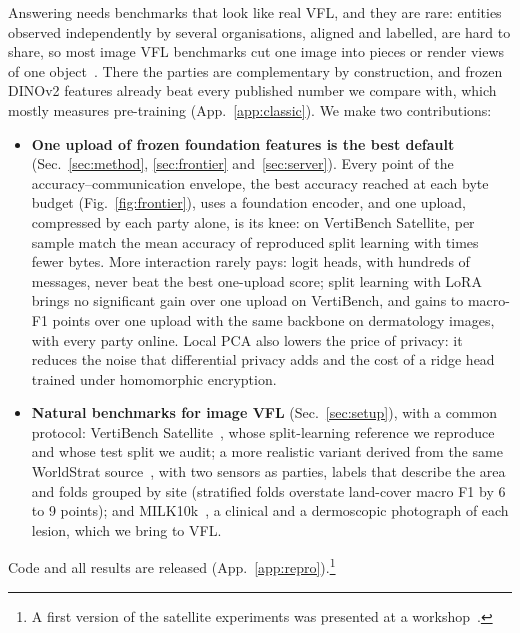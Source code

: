 Answering needs benchmarks that look like real VFL, and they are rare: entities observed independently by several organisations, aligned and labelled, are hard to share, so most image VFL benchmarks cut one image into pieces or render views of one object~\cite{zou2024vflair,wu2024vertibench}. There the parties are complementary by construction, and frozen DINOv2 features already beat every published number we compare with, which mostly measures pre-training (App.~\ref{app:classic}). We make two contributions:
\begin{itemize}
\item[\textbf{C1}] \textbf{One upload of frozen foundation features is the best default} (Sec.~\ref{sec:method}, \ref{sec:frontier} and~\ref{sec:server}). Every point of the accuracy--communication envelope, the best accuracy reached at each byte budget (Fig.~\ref{fig:frontier}), uses a foundation encoder, and one upload, compressed by each party alone, is its knee: on VertiBench Satellite, \frVbReachSplitNNFoundBytes{} per sample match the mean accuracy of reproduced split learning with \frVbReachSplitNNFoundRatio{} times fewer bytes. More interaction rarely pays: logit heads, with hundreds of messages, never beat the best one-upload score; split learning with LoRA~\cite{hu2022lora} brings no significant gain over one upload on VertiBench, and gains \fzGapViewsCb{} to \fzGapViewsB{} macro-F1 points over one upload with the same backbone on dermatology images, with every party online. Local PCA also lowers the price of privacy: it reduces the noise that differential privacy adds and the cost of a ridge head trained under homomorphic encryption.
\item[\textbf{C2}] \textbf{Natural benchmarks for image VFL} (Sec.~\ref{sec:setup}), with a common protocol: VertiBench Satellite~\cite{wu2024vertibench}, whose split-learning reference we reproduce and whose test split we audit; a more realistic variant derived from the same WorldStrat source~\cite{cornebise2022worldstrat}, with two sensors as parties, labels that describe the area and folds grouped by site (stratified folds overstate land-cover macro F1 by 6 to 9 points); and MILK10k~\cite{milk10k}, a clinical and a dermoscopic photograph of each lesion, which we bring to VFL.
\end{itemize}
Code and all results are released (App.~\ref{app:repro}).\footnote{A first version of the satellite experiments was presented at a workshop~\cite{desprez2024jdse}.}
